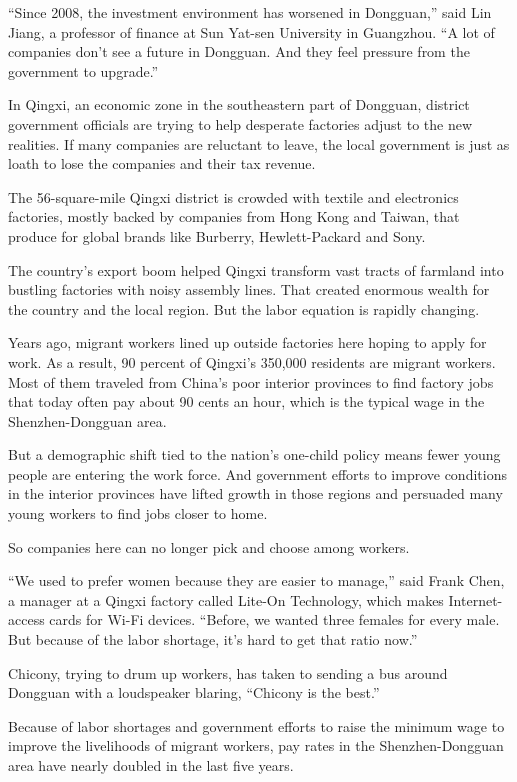 ﻿\documentclass[12pt]{article}
\begin{document}
``Since 2008, the investment environment has worsened in Dongguan,'' said Lin Jiang, a professor of
finance at Sun Yat-sen University in Guangzhou. ``A lot of companies don't see a future in Dongguan.
And they feel pressure from the government to upgrade.''

In Qingxi, an economic zone in the southeastern part of Dongguan, district government officials are
trying to help desperate factories adjust to the new realities. If many companies are reluctant to
leave, the local government is just as loath to lose the companies and their tax revenue.

The 56-square-mile Qingxi district is crowded with textile and electronics factories, mostly backed
by companies from Hong Kong and Taiwan, that produce for global brands like Burberry,
Hewlett-Packard and Sony.

The country's export boom helped Qingxi transform vast tracts of farmland into bustling factories
with noisy assembly lines. That created enormous wealth for the country and the local region. But
the labor equation is rapidly changing.

Years ago, migrant workers lined up outside factories here hoping to apply for work. As a result, 90
percent of Qingxi's 350,000 residents are migrant workers. Most of them traveled from China's poor
interior provinces to find factory jobs that today often pay about 90 cents an hour, which is the
typical wage in the Shenzhen-Dongguan area.

But a demographic shift tied to the nation's one-child policy means fewer young people are entering
the work force. And government efforts to improve conditions in the interior provinces have lifted
growth in those regions and persuaded many young workers to find jobs closer to home.

So companies here can no longer pick and choose among workers.

``We used to prefer women because they are easier to manage,'' said Frank Chen, a manager at a
Qingxi factory called Lite-On Technology, which makes Internet-access cards for Wi-Fi devices.
``Before, we wanted three females for every male. But because of the labor shortage, it's hard to
get that ratio now.''

Chicony, trying to drum up workers, has taken to sending a bus around Dongguan with a loudspeaker
blaring, ``Chicony is the best.''

Because of labor shortages and government efforts to raise the minimum wage to improve the
livelihoods of migrant workers, pay rates in the Shenzhen-Dongguan area have nearly doubled in the
last five years.
\end{document}
